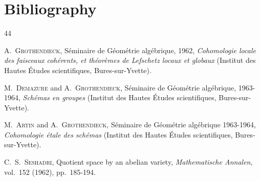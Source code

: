 \clearpage
{}
{}
\section*{Bibliography}

\makeatletter
\protected@write{}%
\protected@write{}%
\protected@write{}%
\makeatother

\begin{thebibliography}{44}

A.~\textsc{Grothendieck}, S\'eminaire de G\'eom\'etrie alg\'ebrique, 1962,
\emph{Cohomologie locale des faisceaux coh\'erents, et th\'eor\`emes de Lefschetz
locaux et globaux} (Institut des Hautes \'Etudes scientifiques,
Bures-sur-Yvette).

M.~\textsc{Demazure} and A.~\textsc{Grothendieck}, S\'eminaire de G\'eom\'etrie
alg\'ebrique, 1963-1964, \emph{Sch\'emas en groupes} (Institut des Hautes
\'Etudes scientifiques, Bures-sur-Yvette).

M.~\textsc{Artin} and A.~\textsc{Grothendieck}, S\'eminaire de G\'eom\'etrie
alg\'ebrique 1963-1964, \emph{Cohomologie \'etale des sch\'emas} (Institut des
Hautes \'Etudes scientifiques, Bures-sur-Yvette).

C.~S.~\textsc{Seshadri}, Quotient space by an abelian variety,
\emph{Mathematische Annalen}, vol.~152 (1962), pp.~185-194.

\end{thebibliography}

